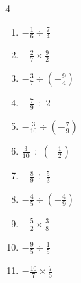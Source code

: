 \begin{multicols}{4}
\begin{enumerate}
  \item $\displaystyle -\frac{1}{6}\div{}\frac{7}{4}$


  \item $\displaystyle -\frac{2}{7}\times{}\frac{9}{2}$


  \item $\displaystyle -\frac{3}{7}\div{}\left(-\frac{9}{4}\right)$


  \item $\displaystyle -\frac{7}{9}\div{}2$


  \item $\displaystyle -\frac{3}{10}\div{}\left(-\frac{7}{9}\right)$


  \item $\displaystyle \frac{3}{10}\div{}\left(-\frac{1}{2}\right)$


  \item $\displaystyle -\frac{8}{9}\div{}\frac{5}{3}$


\columnbreak %

\resetques

  \item $\displaystyle -\frac{4}{5}\div{}\left(-\frac{4}{9}\right)$


  \item $\displaystyle -\frac{5}{2}\times{}\frac{3}{8}$


  \item $\displaystyle -\frac{9}{5}\div{}\frac{1}{5}$

        \phantom{$\displaystyle =-9$}

  \item $\displaystyle -\frac{10}{7}\times{}\frac{7}{5}$

        \phantom{$\displaystyle =-2$}


\end{enumerate}
\end{multicols}
